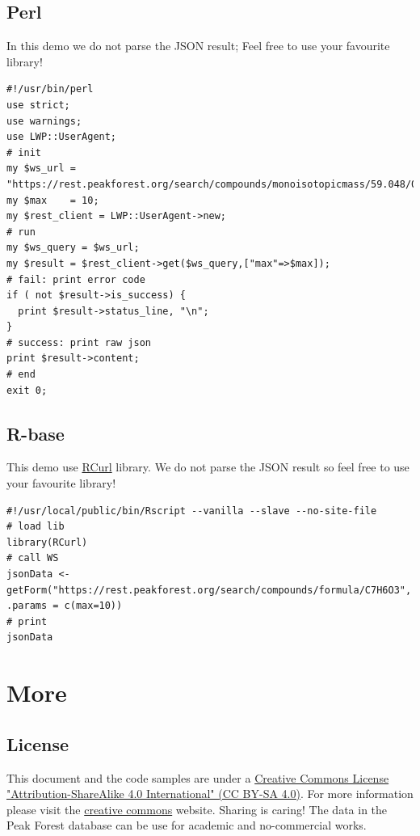 \subsection{Perl}
\hspace*{\parindent}
In this demo we do not parse the JSON result; 
Feel free to use your favourite library!
\begin{lstlisting}[language=customPerl,caption={Perl request}]
#!/usr/bin/perl
use strict;
use warnings;
use LWP::UserAgent;
# init
my $ws_url = "https://rest.peakforest.org/search/compounds/monoisotopicmass/59.048/0.02";
my $max    = 10;
my $rest_client = LWP::UserAgent->new;
# run
my $ws_query = $ws_url;
my $result = $rest_client->get($ws_query,["max"=>$max]);
# fail: print error code
if ( not $result->is_success) {
  print $result->status_line, "\n";
}
# success: print raw json
print $result->content;
# end
exit 0;
\end{lstlisting}

\subsection{R-base}
\hspace*{\parindent}
This demo use \href{http://cran.r-project.org/web/packages/RCurl/index.html}{RCurl} library. 
We do not parse the JSON result so feel free to use your favourite library!
\begin{lstlisting}[language=customR,caption={R-base request}]
#!/usr/local/public/bin/Rscript --vanilla --slave --no-site-file
# load lib
library(RCurl)
# call WS
jsonData <- getForm("https://rest.peakforest.org/search/compounds/formula/C7H6O3", .params = c(max=10))
# print
jsonData
\end{lstlisting}
\section{More} %



\subsection{License}
\hspace*{\parindent}
This document and the code samples are under a \href{http://creativecommons.org/licenses/by-sa/4.0/}{Creative Commons License "Attribution-ShareAlike 4.0 International" (CC BY-SA 4.0)}. 
For more information please visit the \href{http://creativecommons.org/}{creative commons} website.
Sharing is caring! 
\newline
\hspace*{\parindent}
The data in the Peak Forest database can be use for academic and no-commercial works.

